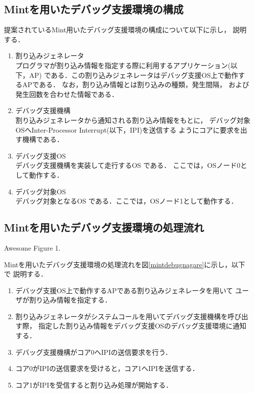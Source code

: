 \documentclass[tanilab-enum]{graduate}
\begin{document}
\subsection{Mintを用いたデバッグ支援環境の構成}
提案されているMint用いたデバッグ支援環境の構成について以下に示し，
説明する．
\begin{enumerate}
    \item 割り込みジェネレータ\\
        プログラマが割り込み情報を指定する際に利用するアプリケーション(以下，AP)
        である．この割り込みジェネレータはデバッグ支援OS上で動作するAPである．
        なお，割り込み情報とは割り込みの種類，発生間隔，
        および発生回数を合わせた情報である．
    \item デバッグ支援機構\\
        割り込みジェネレータから通知される割り込み情報をもとに，
        デバッグ対象OSへInter-Processor Interrupt(以下，IPI)を送信する
        ようにコアに要求を出す機構である．
    \item デバッグ支援OS\\
        デバッグ支援機構を実装して走行するOS である．
        ここでは，OSノード0として動作する．
    \item デバッグ対象OS\\
        デバッグ対象となるOS である．ここでは，OSノード1として動作する．
\end{enumerate}
\subsection{Mintを用いたデバッグ支援環境の処理流れ}
{Awesome Figure 1.}

Mintを用いたデバッグ支援環境の処理流れを図\ref{mintdebugnagare}に示し，以下で
説明する．
\begin{enumerate}
    \item 
        デバッグ支援OS上で動作するAPである割り込みジェネレータを用いて
        ユーザが割り込み情報を指定する．
    \item 
        割り込みジェネレータがシステムコールを用いてデバッグ支援機構を呼び出す際，
        指定した割り込み情報をデバッグ支援OSのデバッグ支援環境に通知する．
    \item 
        デバッグ支援機構がコア0へIPIの送信要求を行う．
    \item 
        コア0がIPIの送信要求を受けると，コア1へIPIを送信する．
    \item 
        コア1がIPIを受信すると割り込み処理が開始する．
\end{enumerate}
\end{document}
